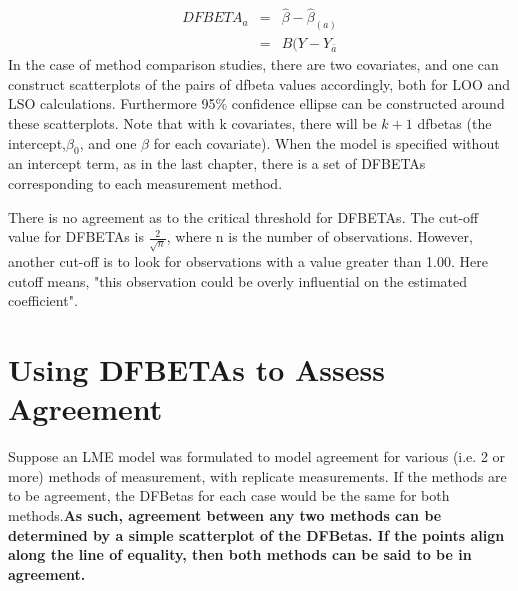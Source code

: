 \documentclass[12pt, a4paper]{report}
\theoremstyle{plain}
\theoremstyle{definition}
\theoremstyle{remark}
\begin{document}


\begin{eqnarray}
DFBETA_{a} &=& \hat{\beta} - \hat{\beta}_{(a)} \\
&=& B(Y-Y_{\bar{a}}
\end{eqnarray}
In the case of method comparison studies, there are two covariates, and one can construct scatterplots of the pairs of dfbeta values accordingly, both for LOO and LSO calculations. Furthermore 95\% confidence ellipse can be constructed around these scatterplots.
Note that with k covariates, there will be $k+1$ dfbetas (the intercept,$\beta_0$, and one $\beta$ for each covariate). When the model is specified without an intercept term, as in the last chapter, there is a set of DFBETAs corresponding to each measurement method.





There is no agreement as to the critical threshold for DFBETAs. The cut-off value for DFBETAs is $\frac{2}{\sqrt{n}}$, where n is the number of observations. 
However, another cut-off is to look for observations with a value greater than 1.00. Here cutoff means, 
"this observation could be overly influential on the estimated coefficient".

\section*{ Using DFBETAs to Assess Agreement}
Suppose an LME model was formulated to model agreement for various (i.e. 2 or more) methods of measurement, with replicate measurements. If the methods are to be agreement, the DFBetas for each case would be the same for both methods.\textbf{As such, agreement between any two methods can be determined by a simple scatterplot of the DFBetas. If the points align along the line of equality, then both methods can be said to be in agreement.}
\end{document}

